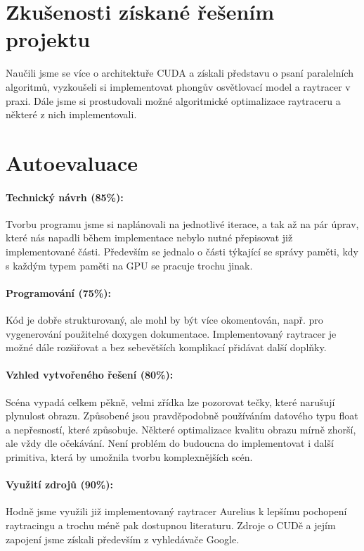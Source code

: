 \documentclass[12pt,a4paper,titlepage,final]{report}
\begin{document}
\section{Zkušenosti získané řešením projektu}

Naučili jsme se více o architektuře CUDA a získali představu o psaní paralelních algoritmů, vyzkoušeli si implementovat phongův osvětlovací model a raytracer v praxi. Dále jsme si prostudovali možné algoritmické optimalizace raytraceru a některé z nich implementovali.


\section{Autoevaluace}

\paragraph{Technický návrh (85\%):} 
Tvorbu programu jsme si naplánovali na jednotlivé iterace, a tak až na pár úprav, které nás napadli během implementace nebylo nutné přepisovat již implementované části. Především se jednalo o části týkající se správy paměti, kdy s každým typem paměti na GPU se pracuje trochu jinak.

\paragraph{Programování (75\%):}
Kód je dobře strukturovaný, ale mohl by být více okomentován, např. pro vygenerování použitelné doxygen dokumentace. 
Implementovaný raytracer je možné dále rozšiřovat a bez sebevětších komplikací přidávat další doplňky.

\paragraph{Vzhled vytvořeného řešení (80\%):} 
Scéna vypadá celkem pěkně, velmi zřídka lze pozorovat tečky, které narušují plynulost obrazu. Způsobené jsou pravděpodobně používáním datového typu float a nepřesností, které způsobuje. Některé optimalizace kvalitu obrazu mírně zhorší, ale vždy dle očekávání. Není problém do budoucna do implementovat i další primitiva, která by umožnila tvorbu komplexnějších scén.

\paragraph{Využití zdrojů (90\%):}
Hodně jsme využili již implementovaný raytracer Aurelius k lepšímu pochopení raytracingu a trochu méně pak dostupnou literaturu. Zdroje o CUDě a jejím zapojení jsme získali především z vyhledávače Google.
\end{document}
